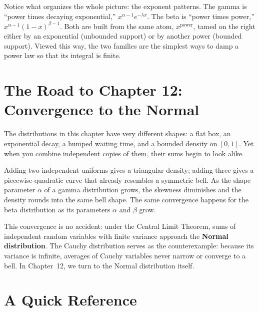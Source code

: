 \begin{aestheticbox}
Notice what organizes the whole picture: the exponent patterns. The gamma is
``power times decaying exponential,'' $x^{\alpha-1}e^{-\lambda x}$. The beta is
``power times power,'' $x^{\alpha-1}(1-x)^{\beta-1}$. Both are built from the
same atom, $x^{\text{power}}$, tamed on the right either by an exponential
(unbounded support) or by another power (bounded support). Viewed this way, the two
families are the simplest ways to damp a power law so that its integral is finite.
\end{aestheticbox}

\section{The Road to Chapter 12: Convergence to the Normal}
\label{ch11:bridge-normal}

The distributions in this chapter have very different shapes: a flat box, an
exponential decay, a humped waiting time, and a bounded density on $[0,1]$.
Yet when you combine independent copies of them, their sums begin to look alike.

Adding two independent uniforms gives a triangular density; adding three gives a
piecewise-quadratic curve that already resembles a symmetric bell. As the shape
parameter $\alpha$ of a gamma distribution grows, the skewness diminishes and the
density rounds into the same bell shape. The same convergence happens for the beta
distribution as its parameters $\alpha$ and $\beta$ grow.

This convergence is no accident: under the Central Limit Theorem, sums of
independent random variables with finite variance approach the \textbf{Normal
distribution}. The Cauchy distribution serves as the counterexample: because its
variance is infinite, averages of Cauchy variables never narrow or converge to a
bell. In Chapter~12, we turn to the Normal distribution itself.

\section{A Quick Reference}
\label{ch11:reference}

